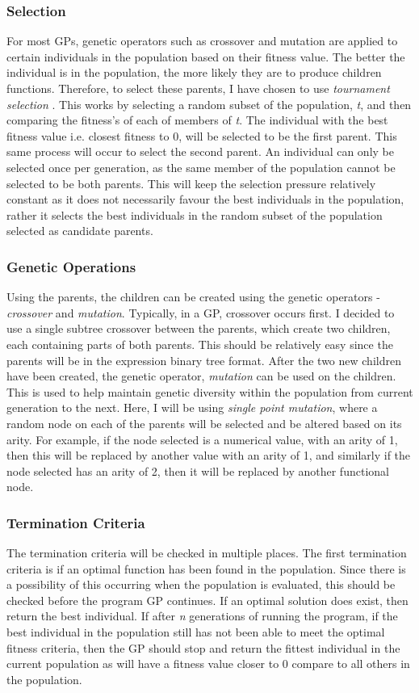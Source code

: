 \documentclass[11pt]{article}
\begin{document}
\subsubsection{Selection}
For most GPs, genetic operators such as crossover and mutation are applied to certain individuals in the population based on their fitness value. The better the individual is in the population, the more likely they are to produce children functions. Therefore,
to select these parents, I have chosen to use \textit{tournament selection} \cite{?}. This works by selecting a random subset of the population, \textit{t}, and then comparing the fitness's of each of members of \textit{t}. The individual with the best fitness value i.e. closest fitness to 0, will be selected to be the first parent. This same process will occur to select the second parent. An individual can only be selected once per generation, as the same member of the population cannot be selected to be both parents. This will keep the selection pressure relatively constant as it does not necessarily favour the best individuals in the population, rather it selects the best individuals in the random subset of the population selected as candidate parents. 
\subsubsection{Genetic Operations}
Using the parents, the children can be created using the genetic operators - \textit{crossover} and \textit{mutation}. Typically, in a GP, crossover occurs first. I decided to use a single subtree crossover between the parents, which create two children, each containing parts of both parents. This should be relatively easy since the parents will be in the expression binary tree format. 
After the two new children have been created, the genetic operator,  \textit{mutation} can be used on the children. This is used to help maintain genetic diversity within the population from current generation to the next.  Here, I will be using \textit{single point mutation}, where a random node on each of the parents will be selected and be altered based on its arity. For example, if the node selected is a numerical value, with an arity of 1, then this will be replaced by another value with an arity of 1, and similarly if the node selected has an arity of 2, then it will be replaced by another functional node.
\subsubsection{Termination Criteria}
The termination criteria will be checked in multiple places. The first termination criteria is if an optimal function has been found in the population. Since there is a possibility of this occurring when the population is evaluated, this should be checked before the program GP continues. If an optimal solution does exist, then return the best individual. If after \textit{n} generations of running the program, if the best individual in the population still has not been able to meet the optimal fitness criteria, then the GP should stop and return the fittest individual in the current population as will have a fitness value closer to 0 compare to all others in the population. 
\end{document}
